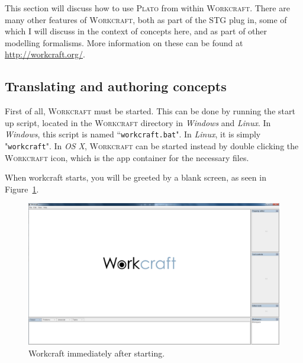 \documentclass[british,technote,compsoc]{IEEEtran}
\newcommand{\noun}[1]{\textsc{#1}}
\begin{document}
This section will discuss how to use \noun{Plato} from within \noun{Workcraft}. There are many other features of \noun{Workcraft}, both as part of the STG plug in, some of which I
 will discuss in the context of concepts here, and as part of other modelling formalisms. More information on these can be found at \url{http://workcraft.org/}.
 
\subsection{Translating and authoring concepts}

First of all, \noun{Workcraft} must be started. This can be done by running the start up script, located in the \noun{Workcraft} directory in \emph{Windows} and \emph{Linux}. In 
\emph{Windows}, this script is named ``\texttt{workcraft.bat}". In \emph{Linux}, it is simply "\texttt{workcraft}". In \emph{OS X}, \noun{Workcraft} can be started instead by double 
clicking the \noun{Workcraft} icon, which is the app container for the necessary files. 

When workcraft starts, you will be greeted by a blank screen, as seen in Figure~\ref{fig:blank_workcraft_screen}.

\begin{figure}[H]
\begin{centering}
\includegraphics[scale=0.2]{images/blank_workcraft_screenshot}
\par\end{centering}

\begin{centering}
\protect\caption{\label{fig:blank_workcraft_screen}Workcraft immediately after starting.}

\par\end{centering}

\end{figure}
\end{document}
